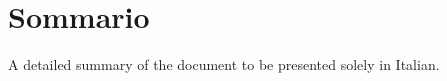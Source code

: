 \newpage
\chapter*{Sommario}


\noindent A detailed summary of the document to be presented solely in Italian. 